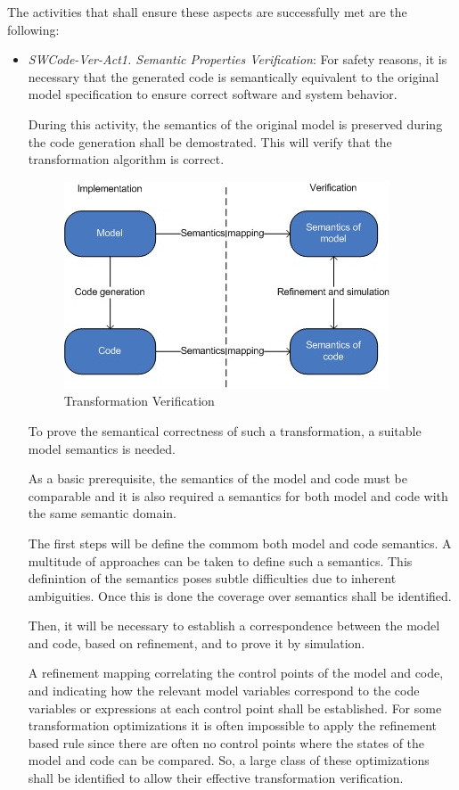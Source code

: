 \documentclass{template/openetcs_report}
\begin{document}
The activities that shall ensure these aspects are successfully met are the following:
\begin{itemize}
\item {\it SWCode-Ver-Act1. Semantic Properties Verification}: For safety reasons, it is necessary that the generated code is semantically equivalent to the original model specification to ensure correct software and system behavior.

During this activity, the semantics of the original model is preserved during the code generation shall be demostrated. This will verify that the transformation algorithm is correct.

\begin{figure}[h]
  \centering
  \includegraphics[scale=1]{images/transformation_verification.jpg}
  \caption{Transformation Verification}
  \label{fig:transformationver}
\end{figure}

To prove the semantical correctness of such a transformation, a suitable model semantics is needed.

As a basic prerequisite, the semantics of the model and code must be comparable and it is also required a semantics for both model and code with the same semantic domain.

The first steps will be define the commom both model and code semantics. A multitude of approaches can be taken to define such a semantics. This definintion of the semantics poses subtle difficulties due to inherent ambiguities. Once this is done the coverage over semantics shall be identified.

Then, it will be necessary to establish a correspondence between the model and code, based on refinement, and to prove it by simulation.

A refinement mapping correlating the control points of the model and code, and indicating how the relevant model variables correspond to the code variables or expressions at each control point shall be established. For some transformation optimizations it is often impossible to apply the refinement based rule since there are often no control points where the states of the model and code can be compared. So, a large class of these optimizations shall be identified to allow their effective transformation verification.


\end{itemize}
\end{document}
